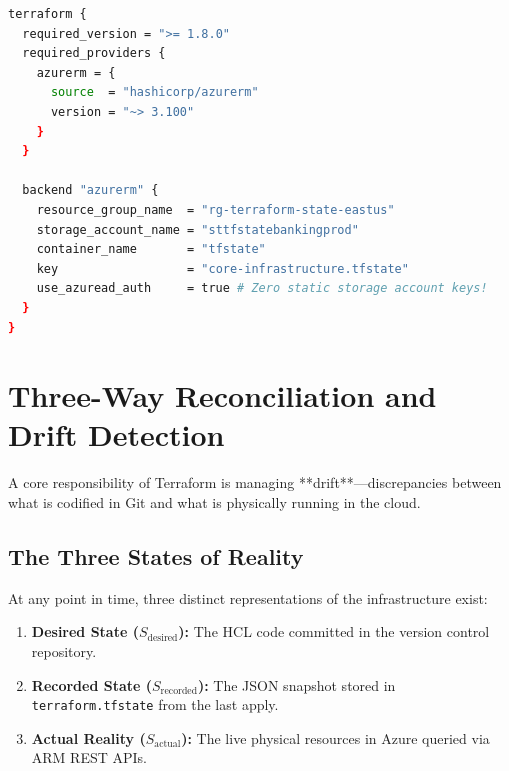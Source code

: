 \begin{lstlisting}[language=bash, caption={Production Azure Blob Remote Backend Configuration}]
terraform {
  required_version = ">= 1.8.0"
  required_providers {
    azurerm = {
      source  = "hashicorp/azurerm"
      version = "~> 3.100"
    }
  }

  backend "azurerm" {
    resource_group_name  = "rg-terraform-state-eastus"
    storage_account_name = "sttfstatebankingprod"
    container_name       = "tfstate"
    key                  = "core-infrastructure.tfstate"
    use_azuread_auth     = true # Zero static storage account keys!
  }
}
\end{lstlisting}

\section{Three-Way Reconciliation and Drift Detection}

A core responsibility of Terraform is managing **drift**---discrepancies between what is codified in Git and what is physically running in the cloud.

\subsection{The Three States of Reality}
At any point in time, three distinct representations of the infrastructure exist:
\begin{enumerate}[leftmargin=15pt]
  \item \textbf{Desired State ($S_{\text{desired}}$):} The HCL code committed in the version control repository.
  \item \textbf{Recorded State ($S_{\text{recorded}}$):} The JSON snapshot stored in \texttt{terraform.tfstate} from the last apply.
  \item \textbf{Actual Reality ($S_{\text{actual}}$):} The live physical resources in Azure queried via ARM REST APIs.
\end{enumerate}

